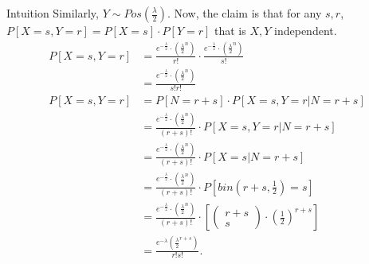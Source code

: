 \documentclass[a4paper]{article}
\begin{document}
\begin{remark}{Intuition}
Similarly, $Y \sim Pos(\frac{\lambda}{2})$. Now, the claim is that for any $s,r$,  $P[X=s, Y=r] = P[X=s] \cdot P[Y=r]$ that is  $X,Y$ independent.
 \begin{align*}
   P[X=s, Y=r] &= \frac{e^{-\frac{\lambda}{2}} \cdot \left( \frac{\lambda}{2}^{n} \right) }{r!} \cdot \frac{e^{-\frac{\lambda}{2}} \cdot \left( \frac{\lambda}{2}^{n} \right) }{s!} \\
                &=  \frac{e^{-\frac{\lambda}{2}} \cdot \left( \frac{\lambda}{2}^{n} \right) }{s! r!}  \\
   P[X=s, Y=r] &= P[N = r + s] \cdot P[X=s, Y=r | N = r+ s] \\
               &= \frac{e^{-\frac{\lambda}{2}} \cdot \left( \frac{\lambda}{2}^{n} \right) }{(r+s)!} \cdot P[X=s, Y=r | N = r+s] \\
               &= \frac{e^{-\frac{\lambda}{2}} \cdot \left( \frac{\lambda}{2}^{n} \right) }{(r+s)!} \cdot P[X=s | N=r+s] \\
               &= \frac{e^{-\frac{\lambda}{2}} \cdot \left( \frac{\lambda}{2}^{n} \right) }{(r+s)!} \cdot P[bin(r+s, \frac{1}{2})=s] \\
               &= \frac{e^{-\frac{\lambda}{2}} \cdot \left( \frac{\lambda}{2}^{n} \right) }{(r+s)!}  \cdot [\begin{pmatrix} r+s \\ s \end{pmatrix} \cdot \left( \frac{1}{2} \right)^{r+s} ] \\
               &= \frac{e^{-\lambda} \left( \frac{\lambda}{2}^{r+s} \right) }{r!s!}
.\end{align*} 
\end{remark}
\end{document}
